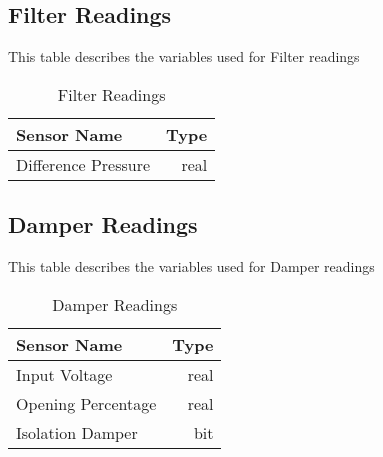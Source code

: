 \subsection{Filter Readings}

This table describes the variables used for Filter readings

\begin{table}[!htb]
\centering
\begin{tabular}{| l r |}
	\hline
	\textbf{Sensor Name}           & \textbf{Type} \\ 
  	\hline
Difference Pressure & real \\
  	\hline
\end{tabular}
\caption{Filter Readings}
\label{table:filter_readings}
\end{table}


\subsection{Damper Readings}

This table describes the variables used for Damper readings

\begin{table}[!htb]
\centering
\begin{tabular}{| l r |}
	\hline
	\textbf{Sensor Name}           & \textbf{Type} \\ 
  	\hline
Input Voltage      & real \\
Opening Percentage & real \\
Isolation Damper   & bit \\
  	\hline
\end{tabular}
\caption{Damper Readings}
\label{table:damper_readings}
\end{table}